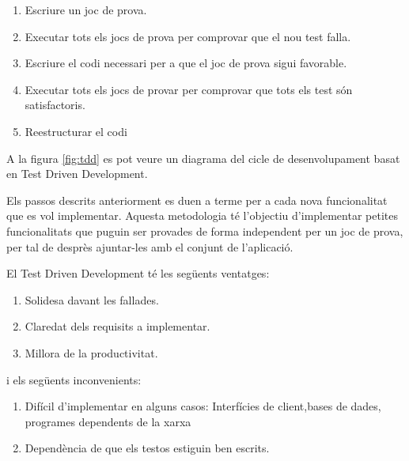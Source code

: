 \begin{enumerate}
    \item{Escriure un joc de prova.}
    \item{Executar tots els jocs de prova per comprovar que el nou test falla.}
    \item{Escriure el codi necessari per a que el joc de prova sigui favorable.}
    \item{Executar tots els jocs de provar per comprovar que tots els test són satisfactoris.}
    \item{Reestructurar el codi}
\end{enumerate}

A la figura \ref{fig:tdd} es pot veure un diagrama del cicle de desenvolupament basat en Test Driven Development.

Els passos descrits anteriorment es duen a terme per a cada nova funcionalitat que es vol implementar. Aquesta metodologia té l'objectiu d'implementar petites funcionalitats que puguin ser provades de forma independent per un joc de prova, per tal de desprès ajuntar-les amb el conjunt de l'aplicació. 

El Test Driven Development té les següents ventatges: 

\begin{enumerate}
    \item{Solidesa davant les fallades.}
    \item{Claredat dels requisits a implementar.}
    \item{Millora de la productivitat.}
\end{enumerate}

i els següents inconvenients: 

\begin{enumerate}
    \item{Difícil d'implementar en alguns casos: Interfícies de client,bases de dades, programes dependents de la xarxa }
    \item{Dependència de que els testos estiguin ben escrits. }
    
\end{enumerate}

